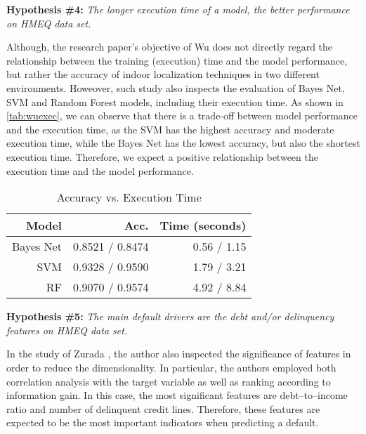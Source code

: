 \vspace{0.5cm}


\noindent \textbf{Hypothesis \#4:} \textit{The longer execution time of a model, the better performance on HMEQ data set.}

Although, the research paper's objective of Wu \citep{wu2018accurate} does not directly regard the relationship between the training (execution) time and the model performance, but rather the accuracy of indoor localization techniques in two different environments.
Howeover, such study also inspects the evaluation of Bayes Net, SVM and Random Forest models, including their execution time. As shown in \autoref{tab:wuexec}, we can observe that there is a trade-off between model performance and the execution time, as the SVM has the highest accuracy and moderate execution time, while the Bayes Net has the lowest accuracy, but also the shortest execution time.
Therefore, we expect a positive relationship between the execution time and the model performance.

\begin{table}[H]
    \small
    \setlength{\tabcolsep}{8pt}
    \renewcommand{\arraystretch}{1.3}
    \centering
    \caption[Accuracy vs. Execution Time \citep{wu2018accurate}]{Accuracy vs. Execution Time \citep{wu2018accurate}}\label{tab:wuexec}
    \begin{tabular}{r r r}
    \toprule
    \textbf{Model} & \textbf{Acc.} & \textbf{Time (seconds)} \\
    \midrule
    \hline
    Bayes Net & 0.8521 / 0.8474 & 0.56 / 1.15 \\
    SVM & 0.9328 / 0.9590 & 1.79 / 3.21 \\
    RF & 0.9070 / 0.9574 & 4.92 / 8.84 \\

    \hline
    \bottomrule
    \end{tabular}
    \vspace{0.35em}
    
    \vspace{-1em}
\end{table}

\vspace{0.5cm}

\noindent \textbf{Hypothesis \#5:} \textit{The main default drivers are the debt and/or delinquency features on HMEQ data set.}

In the study of Zurada \citep{zurada2014classification}, the author also inspected the significance of features in order to reduce the dimensionality. In particular, the authors employed both correlation analysis with the target variable as well as ranking according to information gain.
In this case, the most significant features are debt--to--income ratio and number of delinquent credit lines.
Therefore, these features are expected to be the most important indicators when predicting a default.